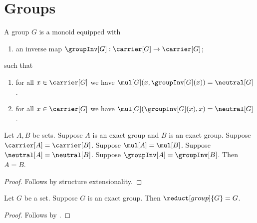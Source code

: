 

\section{Groups}

\begin{struct}\label{group}
    A group $G$ is a monoid equipped with
    \begin{enumerate}
        \item\label{group_inverse_graph}
            an inverse map
            $\groupInv[G]:\carrier[G]\to\carrier[G]$;
    \end{enumerate}
    such that
    \begin{enumerate}
        \item\label{group_inverse_right}
            for all $x\in\carrier[G]$ we have
                $\mul[G](x,\groupInv[G](x))=\neutral[G]$.
        \item\label{group_inverse_left}
            for all $x\in\carrier[G]$ we have
                $\mul[G](\groupInv[G](x),x)=\neutral[G]$.
    \end{enumerate}
\end{struct}

\begin{theorem}\label{exact_group_extensionality}
    Let $A,B$ be sets.
    Suppose $A$ is an exact group and $B$ is an exact group.
    Suppose $\carrier[A]=\carrier[B]$.
    Suppose $\mul[A]=\mul[B]$.
    Suppose $\neutral[A]=\neutral[B]$.
    Suppose $\groupInv[A]=\groupInv[B]$.
    Then $A=B$.
\end{theorem}
\begin{proof}
    Follows by structure extensionality.
\end{proof}

\begin{theorem}\label{exact_group_reduct_eq}
    Let $G$ be a set.
    Suppose $G$ is an exact group.
    Then $\reduct[group]{G}=G$.
\end{theorem}
\begin{proof}
    Follows by .
\end{proof}

